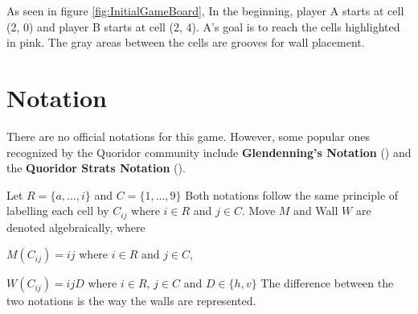 As seen in figure \ref{fig:InitialGameBoard}, In the beginning, player A starts at cell (2, 0) and player B 
starts at cell (2, 4). A's goal is to reach the cells highlighted in pink. The gray areas between the cells
are grooves for wall placement.

\pagebreak

\section{Notation}

There are no official notations for this game. However, some popular ones recognized by the Quoridor community
include \textbf{Glendenning's Notation} (\citep{Glendenning2002MasteringQ}) and the \textbf{Quoridor Strats Notation}
(\citep{website:COMMUNITY_NOTATION}). 
\par
Let $R = \{a, ..., i\}$ and $C = \{1, ..., 9\}$
\newline
Both notations follow the same principle of labelling each cell by $C_{ij}$ where $i \in R$ and $j \in C$.
\newline
Move $M$ and Wall $W$ are denoted algebraically, where
\par
$M(C_{ij}) = ij$ where $i \in R$ and $j \in C $,
\par
$W(C_{ij}) = ijD$ where $i \in R$, $j \in C$ and $D \in \{h, v\}$
\newline
\newline
The difference between the two notations is the way the walls are represented.

